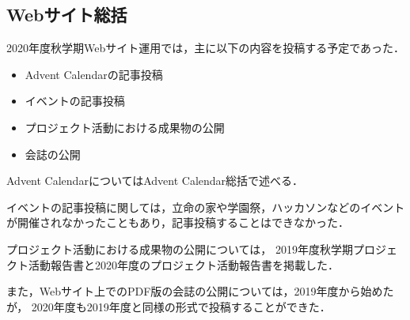 \subsection*{Webサイト総括}



2020年度秋学期Webサイト運用では，主に以下の内容を投稿する予定であった．

\begin{itemize}
  \item Advent Calendarの記事投稿
  \item イベントの記事投稿
  \item プロジェクト活動における成果物の公開
  \item 会誌の公開
\end{itemize}

Advent CalendarについてはAdvent Calendar総括で述べる．

イベントの記事投稿に関しては，立命の家や学園祭，ハッカソンなどのイベントが開催されなかったこともあり，記事投稿することはできなかった．

プロジェクト活動における成果物の公開については，
2019年度秋学期プロジェクト活動報告書と2020年度のプロジェクト活動報告書を掲載した．

また，Webサイト上でのPDF版の会誌の公開については，2019年度から始めたが，
2020年度も2019年度と同様の形式で投稿することができた．
